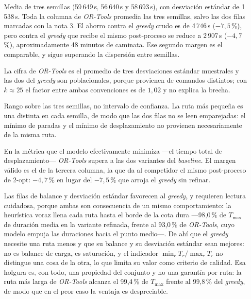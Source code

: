 \begin{table}[H]
\begin{threeparttable}[b]
\begin{tablenotes}[flushleft]
    \item[1] Media de tres semillas (59\,649\,s, 56\,640\,s y 58\,693\,s), con desviación estándar
      de 1\,538\,s. Toda la columna de \textit{OR-Tools} promedia las tres semillas, salvo las dos
      filas marcadas con la nota 3. El ahorro contra el \textit{greedy} crudo es de 4\,746\,s
      ($-7{,}5$\,\%), pero contra el \textit{greedy} que recibe el mismo post-proceso se reduce a
      2\,907\,s ($-4{,}7$\,\%), aproximadamente 48 minutos de caminata. Ese segundo margen es el
      comparable, y sigue superando la dispersión entre semillas.
    \item[2] La cifra de \textit{OR-Tools} es el promedio de tres desviaciones estándar muestrales
      y las dos del \textit{greedy} son poblacionales, porque provienen de comandos distintos; con
      $k \approx 25$ el factor entre ambas convenciones es de $1{,}02$ y no explica la brecha.
    \item[3] Rango sobre las tres semillas, no intervalo de confianza. La ruta más pequeña es una
      distinta en cada semilla, de modo que las dos filas no se leen emparejadas: el mínimo de
      paradas y el mínimo de desplazamiento no provienen necesariamente de la misma ruta.
  \end{tablenotes}
  \end{threeparttable}
\end{table}

En la métrica que el modelo efectivamente minimiza ---el tiempo total de desplazamiento---
\textit{OR-Tools} supera a las dos variantes del \textit{baseline}. El margen válido es el de la
tercera columna, la que da al competidor el mismo post-proceso de 2-opt: $-4{,}7$\,\% en lugar del
$-7{,}5$\,\% que arroja el \textit{greedy} sin refinar.

Las filas de balance y desviación estándar favorecen al \textit{greedy}, y requieren lectura
cuidadosa, porque ambas son consecuencia de un mismo comportamiento: la heurística voraz llena cada
ruta hasta el borde de la cota dura ---98{,}0\,\% de $T_{\max}$ de duración media en la variante
refinada, frente al 93{,}0\,\% de \textit{OR-Tools}, cuyo modelo empuja las duraciones hacia el
punto medio---. De ahí que el \textit{greedy} necesite una ruta menos y que su balance y su
desviación estándar sean mejores: no es balance de carga, es saturación, y el indicador
$\min_r T_r / \max_r T_r$ no distingue una cosa de la otra, lo que limita su valor como criterio de
calidad. Esa holgura es, con todo, una propiedad del conjunto y no una garantía por ruta: la ruta
más larga de \textit{OR-Tools} alcanza el 99{,}4\,\% de $T_{\max}$ frente al 99{,}8\,\% del
\textit{greedy}, de modo que en el peor caso la ventaja es despreciable.

